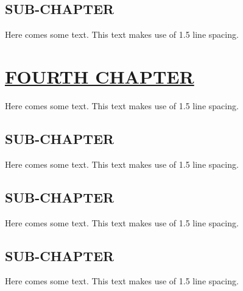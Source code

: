 \documentclass{article}
\begin{document}
{{{{{{{\subsection{SUB-CHAPTER}
Here comes some text. This text makes use of 1.5 line spacing. 
\pagebreak
\section{\uline{FOURTH CHAPTER}}
Here comes some text. This text makes use of 1.5 line spacing. 
\subsection{SUB-CHAPTER}
Here comes some text. This text makes use of 1.5 line spacing. 
\subsection{SUB-CHAPTER}
Here comes some text. This text makes use of 1.5 line spacing. 
\subsection{SUB-CHAPTER}
Here comes some text. This text makes use of 1.5 line spacing. 
\pagebreak
}}}}}}}
\end{document}
